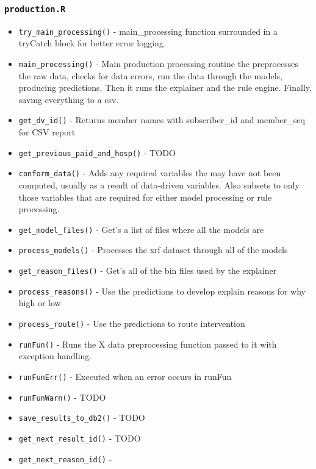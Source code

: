 \documentclass[
]{book}
\providecommand{\tightlist}{%
  \setlength{\itemsep}{0pt}\setlength{\parskip}{0pt}}
\begin{document}
\hypertarget{production.r}{%
\subsubsection{\texorpdfstring{\texttt{production.R}}{production.R}}\label{production.r}}

\begin{itemize}
\tightlist
\item
  \texttt{try\_main\_processing()} - main\_processing function surrounded in a tryCatch block for better error logging.
\item
  \texttt{main\_processing()} - Main production processing routine the preprocesses the raw data, checks for data errors, run the data through the models, producing predictions. Then it runs the explainer and the rule engine. Finally, saving everything to a csv.
\item
  \texttt{get\_dv\_id()} - Returns member names with subscriber\_id and member\_seq for CSV report
\item
  \texttt{get\_previous\_paid\_and\_hosp()} - TODO
\item
  \texttt{conform\_data()} - Adds any required variables the may have not been computed, usually as a result of data-driven variables. Also subsets to only those variables that are required for either model processing or rule processing.
\item
  \texttt{get\_model\_files()} - Get's a list of files where all the models are
\item
  \texttt{process\_models()} - Processes the xrf dataset through all of the models
\item
  \texttt{get\_reason\_files()} - Get's all of the bin files used by the explainer
\item
  \texttt{process\_reasons()} - Use the predictions to develop explain reasons for why high or low
\item
  \texttt{process\_route()} - Use the predictions to route intervention
\item
  \texttt{runFun()} - Runs the X data preprocessing function passed to it with exception handling.
\item
  \texttt{runFunErr()} - Executed when an error occurs in runFun
\item
  \texttt{runFunWarn()} - TODO
\item
  \texttt{save\_results\_to\_db2()} - TODO
\item
  \texttt{get\_next\_result\_id()} - TODO
\item
  \texttt{get\_next\_reason\_id()} -

\end{itemize}
\end{document}

